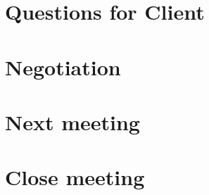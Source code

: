 \documentclass[11pt, a4paper]{article}
\begin{document}
\section{Questions for Client}

\section{Negotiation}


\section{Next meeting}

\section {Close meeting}
\vspace*{10pt}
\end{document}
